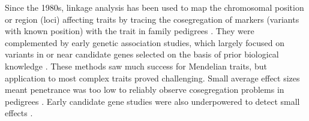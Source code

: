 \begin{outline}
Since the 1980s, linkage analysis has been used to map the chromosomal position or region (loci) affecting traits by tracing the cosegregation of markers (variants with known position) with the trait in family pedigrees \autocite{altshuler2008GeneticMappingHuman,ott2011FamilybasedDesignsGenomewide,visscher2012FiveYearsGWAS}.
They were complemented by early genetic association studies, which largely focused on variants in or near candidate genes selected on the basis of prior biological knowledge \autocite{hirschhorn2002ComprehensiveReviewGenetic}.
These methods saw much success for Mendelian traits, but application to most complex traits proved challenging.
Small average effect sizes meant penetrance was too low to reliably observe cosegregation problems in pedigrees \autocite{visscher2012FiveYearsGWAS}.
Early candidate gene studies were also underpowered to detect small effects \autocite{border2019NoSupportHistorical}.


\end{outline}
